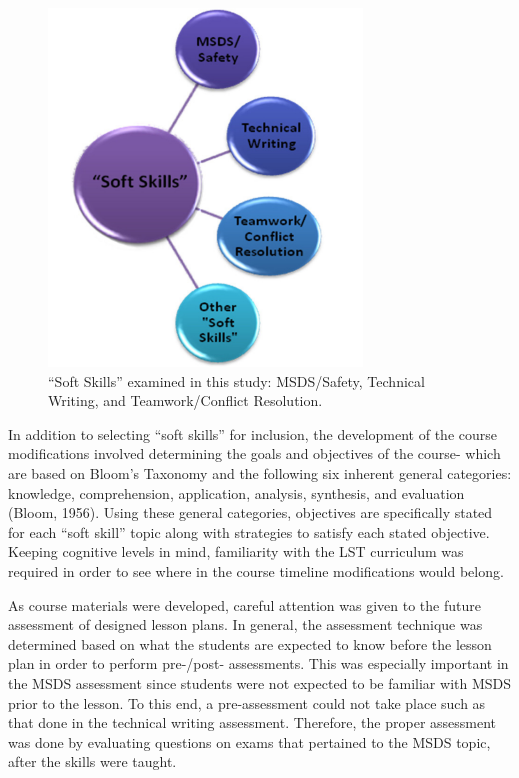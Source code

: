 \documentclass[11.5pt]{sig-alternate} %
\begin{document}
\begin{large}
\begin{figure}[h]
    \centering
    \includegraphics[width=1\linewidth]{images/fig1.png}
    \caption{“Soft Skills” examined in this study: MSDS/Safety, Technical Writing, and Teamwork/Conflict Resolution. }
\end{figure}

In addition to selecting “soft skills” for inclusion, the development of the course modifications involved determining the goals and objectives of the course- which are based on Bloom’s Taxonomy and the following six inherent general categories: knowledge, comprehension, application, analysis, synthesis, and evaluation (Bloom, 1956). Using these general categories, objectives are specifically stated for each “soft skill” topic along with strategies to satisfy each stated objective. Keeping cognitive levels in mind, familiarity with the LST curriculum was required in order to see where in the course timeline modifications would belong. 

As course materials were developed, careful attention was given to the future assessment of  designed lesson plans. In general, the assessment technique was determined based on what the students are expected to know before the lesson plan in order to perform pre-/post- assessments. This was especially important in the MSDS assessment since students were not expected to be familiar with MSDS prior to the lesson. To this end, a pre-assessment could not take place such as that done in the technical writing assessment. Therefore, the proper assessment was done by evaluating questions on exams that pertained to the MSDS topic, after the skills were taught.


\end{large}
\end{document}
